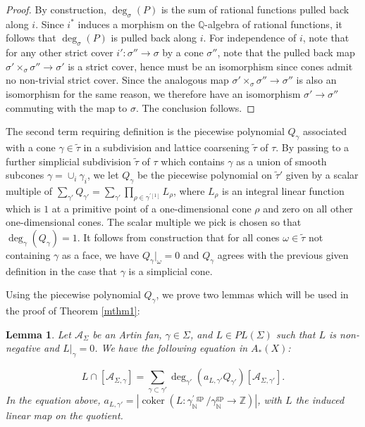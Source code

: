 \documentclass[12pt, oneside]{amsart}   	%
\newcounter{thm}
\newtheorem{lemma}[thm]{Lemma}
\newcommand{\NN}{\mathbb{N}}
\newcommand{\ZZ}{\mathbb{Z}}
\newcommand{\gp}{\operatorname{gp}}
\newcommand{\coker}{\operatorname{coker}}
\numberwithin{equation}{section}
\numberwithin{thm}{section}
\numberwithin{figure}{section}
\begin{document}
\begin{proof}
By construction, $\deg_{\sigma}(P)$ is the sum of rational functions pulled back along $i$. Since $i^*$ induces a morphism on the $\mathbb{Q}$-algebra of rational functions, it follows that $\deg_{\sigma}(P)$ is pulled back along $i$. For independence of $i$, note that for any other strict cover $i':  \sigma'' \rightarrow \sigma$ by a cone $\sigma''$, note that the pulled back map $\sigma' \times_{\sigma} \sigma'' \rightarrow \sigma'$ is a strict cover, hence must be an isomorphism since cones admit no non-trivial strict cover. Since the analogous map $\sigma' \times_{\sigma} \sigma'' \rightarrow \sigma''$ is also an isomorphism for the same reason, we therefore have an isomorphism $\sigma' \rightarrow \sigma''$ commuting with the map to $\sigma$. The conclusion follows. 
\end{proof}


The second term requiring definition is the piecewise polynomial $Q_{\gamma}$ associated with a cone $\gamma \in \tilde{\tau}$ in a subdivision and lattice coarsening $\tilde{\tau}$ of $\tau$. By passing to a further simplicial subdivision $\widetilde{\tau}$ of $\tau$ which contains $\gamma$ as a union of smooth subcones $\gamma = \cup_{i} \gamma_i$, we let $Q_{\gamma}$ be the piecewise polynomial on $\widetilde{\tau}'$ given by a scalar multiple of $\sum_{\gamma'} Q_{\gamma'} = \sum_{\gamma'} \prod_{\rho \in \gamma^{'[1]}} L_\rho$, where $L_\rho$ is an integral linear function which is $1$ at a primitive point of a one-dimensional cone $\rho$ and zero on all other one-dimensional cones. The scalar multiple we pick is chosen so that $\deg_{\gamma}(Q_{\gamma}) = 1$. It follows from construction that for all cones $\omega \in \widetilde{\tau}$ not containing $\gamma$ as a face, we have $Q_{\gamma}|_{\omega} = 0$ and $Q_{\gamma}$ agrees with the previous given definition in the case that $\gamma$ is a simplicial cone. 


Using the piecewise polynomial $Q_{\gamma}$, we prove two lemmas which will be used in the proof of Theorem \ref{mthm1}:
 
\begin{lemma}\label{linlem}
Let $\mathcal{A}_{\Sigma}$ be an Artin fan, $\gamma \in \Sigma$, and $L \in PL(\Sigma)$ such that $L$ is non-negative and $L|_{\gamma} = 0$. We have the following equation in $A_*(X)$:
 
 \begin{equation}\label{PPbase}
 L\cap[\mathcal{A}_{\Sigma,\gamma}]= \sum_{\gamma \subset \gamma'} \deg_{\gamma'}(a_{L,\gamma'}Q_{\gamma'})[\mathcal{A}_{\Sigma,\gamma'}].
 \end{equation}
 In the equation above, $a_{L,\gamma'} = |\coker(L: \gamma^{'\gp}_{\NN}/\gamma^{\gp}_{\NN} \rightarrow \ZZ)|$, with $L$ the induced linear map on the quotient.
 \end{lemma}
 
\end{document}
